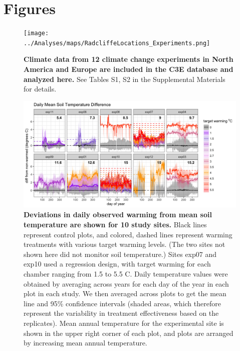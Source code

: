 \documentclass{article}
\begin{document}
\section* {Figures}


\begin{figure}[p]
\centering
\texttt{[image: ../Analyses/maps/RadcliffeLocations\_Experiments.png]} 
\caption{\textbf{Climate data from 12 climate change experiments in North America and Europe are included in the C3E database and analyzed here.} See Tables S1, S2 in the Supplemental Materials for details.} 
 \label{fig:map}
 \end{figure}
\clearpage
\begin{figure}[h]
\centering
 \includegraphics{../Analyses/figures/Exploratory_TimeSeries_SoilTemp1Mean_Deviation.png}
 \caption{\textbf{Deviations in daily observed warming from mean soil temperature are shown for 10 study sites.} Black lines represent control plots, and colored, dashed lines represent warming treatments with various target warming levels. (The two sites not shown here did not monitor soil temperature.) Sites exp07 and exp10 used a regression design, with target warming for each chamber ranging from 1.5 to 5.5 \degree C. Daily temperature values were obtained by averaging across years for each day of the year in each plot in each study. We then averaged across plots to get the mean line and 95\% confidence intervals (shaded areas, which therefore represent the variability in treatment effectiveness based on the replicates). Mean annual temperature for the experimental site is shown in the upper right corner of each plot, and plots are arranged by increasing mean annual temperature.}
 \label{fig:effwarm}

 \end{figure}
\end{document}
